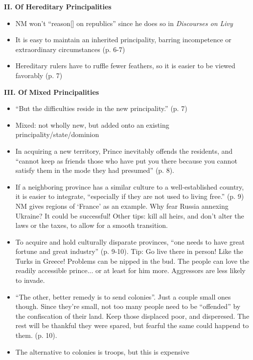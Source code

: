 \documentclass[10pt]{article}
\newcommand{\comment}[1]{{\color{Cerulean}#1}}
\begin{document}
\textbf{II. Of Hereditary Principalities} 
\begin{itemize}
\item
    NM won't ``reason[] on republics'' since he does so in
    \textsl{Discourses on Livy}
\item 
    It is easy to maintain an inherited principality, barring incompetence 
    or extraordinary circumstances (p. 6-7)
\item 
    Hereditary rulers have to ruffle fewer feathers, so it is easier to
    be viewed favorably (p. 7)
\end{itemize}

\textbf{III. Of Mixed Principalities}
\begin{itemize}
\item
    ``But the difficulties reside in the new principality.'' (p. 7)
\item
    Mixed: not wholly new, but added onto an existing 
    principality/state/dominion
\item
    In acquiring a new territory, Prince inevitably offends the residents,
    and ``cannot keep as friends those who have put you there because
    you cannot satisfy them in the mode they had presumed'' (p. 8).
\item
    If a neighboring province has a similar culture to a well-established
    country, it is easier to integrate, ``especially if they are not used
    to living free.'' (p. 9) NM gives regions of `France' as an example.
    \comment{Why fear Russia annexing Ukraine? It could be successful!}
    Other tips: kill all heirs, and don't alter the laws or the taxes,
    to allow for a smooth transition.
\item
    To acquire and hold culturally disparate provinces,
     ``one needs to have great fortune and great industry'' (p. 9-10).
    Tip: Go live there in person! Like the Turks in Greece! 
    Problems can be nipped in the bud. The people can love the readily
    accessible prince... or at least for him more. Aggressors are less
    likely to invade.
\item   
    ``The other, better remedy is to send colonies''. Just a couple small
    ones though. Since they're small, not too many
    people need to be ``offended'' by the confiscation of their land. 
    Keep those displaced poor, and disperesed. 
    The rest will be thankful they were spared, but fearful the same could
    happend to them. 
    (p. 10). 
\item 
    The alternative to colonies is troops, but this is expensive

\end{itemize}
\end{document}
